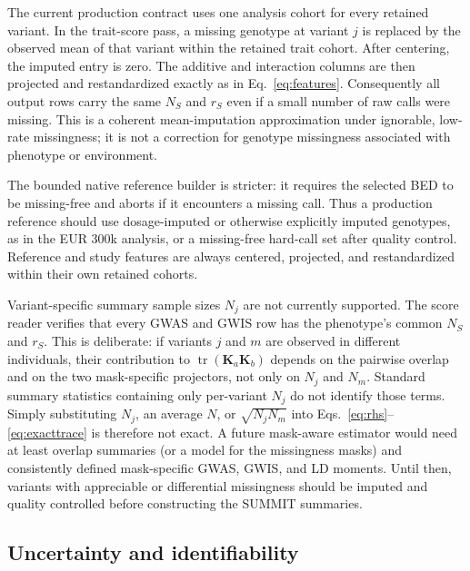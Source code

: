 \documentclass[11pt]{article}
\newcommand{\tr}{\operatorname{tr}}
\newcommand{\bK}{\bm K}
\begin{document}
The current production contract uses one analysis cohort for every retained
variant.  In the trait-score pass, a missing genotype at variant $j$ is
replaced by the observed mean of that variant within the retained trait
cohort.  After centering, the imputed entry is zero.  The additive and
interaction columns are then projected and restandardized exactly as in
Eq.~\eqref{eq:features}.  Consequently all output rows carry the same
$N_S$ and $r_S$ even if a small number of raw calls were missing.  This is a
coherent mean-imputation approximation under ignorable, low-rate missingness;
it is not a correction for genotype missingness associated with phenotype or
environment.

The bounded native reference builder is stricter: it requires the selected
BED to be missing-free and aborts if it encounters a missing call.  Thus a
production reference should use dosage-imputed or otherwise explicitly
imputed genotypes, as in the EUR 300k analysis, or a missing-free hard-call
set after quality control.  Reference and study features are always centered,
projected, and restandardized within their own retained cohorts.

Variant-specific summary sample sizes $N_j$ are not currently supported.
The score reader verifies that every GWAS and GWIS row has the phenotype's
common $N_S$ and $r_S$.  This is deliberate: if variants $j$ and $m$ are
observed in different individuals, their contribution to
$\tr(\bK_a\bK_b)$ depends on the pairwise overlap and on the two
mask-specific projectors, not only on $N_j$ and $N_m$.  Standard summary
statistics containing only per-variant $N_j$ do not identify those terms.
Simply substituting $N_j$, an average $N$, or $\sqrt{N_jN_m}$ into
Eqs.~\eqref{eq:rhs}--\eqref{eq:exacttrace} is therefore not exact.  A future
mask-aware estimator would need at least overlap summaries (or a model for
the missingness masks) and consistently defined mask-specific GWAS, GWIS, and
LD moments.  Until then, variants with appreciable or differential
missingness should be imputed and quality controlled before constructing the
SUMMIT summaries.

\subsection{Uncertainty and identifiability}
\end{document}

